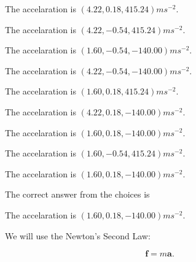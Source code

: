\documentclass[12pt]{article}
\begin{document}
 
 
The accelaration is $  %
(
4.22,
0.18,
415.24)
ms^{-2} $.
 
 
The accelaration is $  %
(
4.22,
-0.54,
415.24)
ms^{-2} $.
 
 
The accelaration is $  %
(
1.60,
-0.54,
-140.00)
ms^{-2} $.
 
 
The accelaration is $  %
(
4.22,
-0.54,
-140.00)
ms^{-2} $.
 
 
The accelaration is $  %
(
1.60,
0.18,
415.24)
ms^{-2} $.
 
 
The accelaration is $  %
(
4.22,
0.18,
-140.00)
ms^{-2} $.
 
 
The accelaration is $  %
(
1.60,
0.18,
-140.00)
ms^{-2} $.
 
 
The accelaration is $  %
(
1.60,
-0.54,
415.24)
ms^{-2} $.
 
 
\noindent{}
 
 
The accelaration is $  %
(
1.60,
0.18,
-140.00)
ms^{-2} $.
 
 
\noindent{}
 
 
 
 
 
\noindent{}
 
 

The correct answer from the choices is


The accelaration is $  %
(
1.60,
0.18,
-140.00)
ms^{-2} $.
 
 
 
\noindent{}
 
 

 
 
 
\noindent{}
 
 

We will use the Newton's Second Law:
 
\[
\mathbf{f}=m\mathbf{a}.
\]
 
\end{document}
